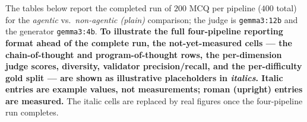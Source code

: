 The tables below report the completed run of $200$ MCQ per pipeline ($400$ total)
for the \emph{agentic} vs.\ \emph{non-agentic (plain)} comparison; the judge is
\texttt{gemma3:12b} and the generator \texttt{gemma3:4b}. \textbf{To illustrate the
full four-pipeline reporting format ahead of the complete run, the not-yet-measured
cells --- the chain-of-thought and program-of-thought rows, the per-dimension judge
scores, diversity, validator precision/recall, and the per-difficulty gold split
--- are shown as illustrative placeholders in \textit{italics}. Italic entries are
example values, not measurements; roman (upright) entries are measured.} The italic
cells are replaced by real figures once the four-pipeline run completes.

\begin{table}[t]
\centering
\small
\caption{Question quality by difficulty and pipeline (judge, $1$--$5$; accept rate
in \%). \emph{Italic} entries are illustrative placeholders (not measured); roman
entries are measured.}
\label{tab:bulk-quality}
\setlength{\tabcolsep}{4pt}
\end{table}

